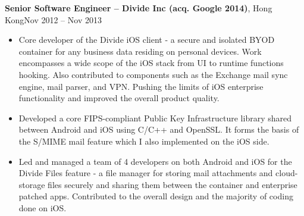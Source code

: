 \documentclass[margin,line]{res}
\begin{document}
\begin{resume}
  \vspace{.5in}
  {\bf Senior Software Engineer -- Divide Inc (acq. Google 2014)}, Hong Kong\hfill Nov 2012 -- Nov 2013
  \vspace{.05in}
  \begin{itemize}
  \item Core developer of the Divide iOS client - a secure and isolated BYOD
        container for any business data residing on personal devices. Work
        encompasses a wide scope of the iOS stack from UI to runtime
        functions hooking. Also contributed to components such as the Exchange
        mail sync engine, mail parser, and VPN. Pushing the limits of iOS
        enterprise functionality and improved the overall product quality.
  \item Developed a core FIPS-compliant Public Key Infrastructure library shared
        between Android and iOS using C/C++ and OpenSSL. It forms the basis of
        the S/MIME mail feature which I also implemented on the iOS side.
  \item Led and managed a team of 4 developers on both Android and iOS for the
        Divide Files feature - a file manager for storing mail attachments and
        cloud-storage files securely and sharing them between the container
        and enterprise patched apps. Contributed to the overall design and
        the majority of coding done on iOS.
  \end{itemize}


\end{resume}
\end{document}

